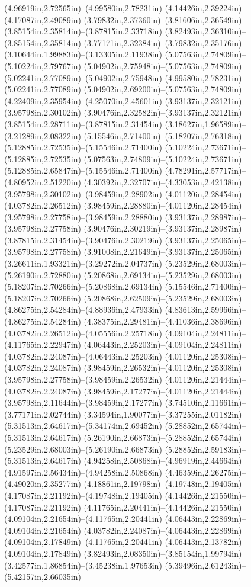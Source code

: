(4.96919in,2.72565in)--(4.99580in,2.78231in) (4.14426in,2.39224in)--(4.17087in,2.49089in) (3.79832in,2.37360in)--(3.81606in,2.36549in) (3.85154in,2.35814in)--(3.87815in,2.33718in) (3.82493in,2.36310in)--(3.85154in,2.35814in) (3.77171in,2.32384in)--(3.79832in,2.35176in) (3.10644in,1.99883in)--(3.13305in,2.11938in) (5.07563in,2.74809in)--(5.10224in,2.79767in) (5.04902in,2.75948in)--(5.07563in,2.74809in) (5.02241in,2.77089in)--(5.04902in,2.75948in) (4.99580in,2.78231in)--(5.02241in,2.77089in) (5.04902in,2.69200in)--(5.07563in,2.74809in) (4.22409in,2.35954in)--(4.25070in,2.45601in) (3.93137in,2.32121in)--(3.95798in,2.30102in) (3.90476in,2.32582in)--(3.93137in,2.32121in) (3.85154in,2.28711in)--(3.87815in,2.31454in) (3.18627in,1.96589in)--(3.21289in,2.08322in) (5.15546in,2.71400in)--(5.18207in,2.76318in) (5.12885in,2.72535in)--(5.15546in,2.71400in) (5.10224in,2.73671in)--(5.12885in,2.72535in) (5.07563in,2.74809in)--(5.10224in,2.73671in) (5.12885in,2.65847in)--(5.15546in,2.71400in) (4.78291in,2.57717in)--(4.80952in,2.51220in) (4.30392in,2.32707in)--(4.33053in,2.42138in) (3.95798in,2.30102in)--(3.98459in,2.28902in) (4.01120in,2.28454in)--(4.03782in,2.26512in) (3.98459in,2.28880in)--(4.01120in,2.28454in) (3.95798in,2.27758in)--(3.98459in,2.28880in) (3.93137in,2.28987in)--(3.95798in,2.27758in) (3.90476in,2.30219in)--(3.93137in,2.28987in) (3.87815in,2.31454in)--(3.90476in,2.30219in) (3.93137in,2.25065in)--(3.95798in,2.27758in) (3.91008in,2.21649in)--(3.93137in,2.25065in) (3.26611in,1.93321in)--(3.29272in,2.04737in) (5.23529in,2.68003in)--(5.26190in,2.72880in) (5.20868in,2.69134in)--(5.23529in,2.68003in) (5.18207in,2.70266in)--(5.20868in,2.69134in) (5.15546in,2.71400in)--(5.18207in,2.70266in) (5.20868in,2.62509in)--(5.23529in,2.68003in) (4.86275in,2.54284in)--(4.88936in,2.47933in) (4.83613in,2.59966in)--(4.86275in,2.54284in) (4.38375in,2.29481in)--(4.41036in,2.38696in) (4.03782in,2.26512in)--(4.05556in,2.25718in) (4.09104in,2.24811in)--(4.11765in,2.22947in) (4.06443in,2.25203in)--(4.09104in,2.24811in) (4.03782in,2.24087in)--(4.06443in,2.25203in) (4.01120in,2.25308in)--(4.03782in,2.24087in) (3.98459in,2.26532in)--(4.01120in,2.25308in) (3.95798in,2.27758in)--(3.98459in,2.26532in) (4.01120in,2.21444in)--(4.03782in,2.24087in) (3.98459in,2.17277in)--(4.01120in,2.21444in) (3.95798in,2.11644in)--(3.98459in,2.17277in) (3.74510in,2.11661in)--(3.77171in,2.02744in) (3.34594in,1.90077in)--(3.37255in,2.01182in) (5.31513in,2.64617in)--(5.34174in,2.69452in) (5.28852in,2.65744in)--(5.31513in,2.64617in) (5.26190in,2.66873in)--(5.28852in,2.65744in) (5.23529in,2.68003in)--(5.26190in,2.66873in) (5.28852in,2.59183in)--(5.31513in,2.64617in) (4.94258in,2.50868in)--(4.96919in,2.44664in) (4.91597in,2.56434in)--(4.94258in,2.50868in) (4.46359in,2.26275in)--(4.49020in,2.35277in) (4.18861in,2.19798in)--(4.19748in,2.19405in) (4.17087in,2.21192in)--(4.19748in,2.19405in) (4.14426in,2.21550in)--(4.17087in,2.21192in) (4.11765in,2.20441in)--(4.14426in,2.21550in) (4.09104in,2.21654in)--(4.11765in,2.20441in) (4.06443in,2.22869in)--(4.09104in,2.21654in) (4.03782in,2.24087in)--(4.06443in,2.22869in) (4.09104in,2.17849in)--(4.11765in,2.20441in) (4.06443in,2.13782in)--(4.09104in,2.17849in) (3.82493in,2.08350in)--(3.85154in,1.99794in) (3.42577in,1.86854in)--(3.45238in,1.97653in) (5.39496in,2.61243in)--(5.42157in,2.66035in) 